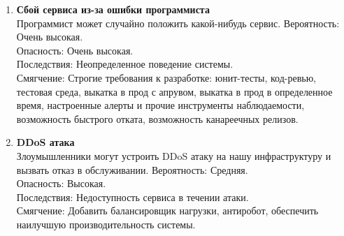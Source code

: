 \begin{enumerate}
      \item \textbf{Сбой сервиса из-за ошибки программиста} \\
            Программист может случайно положить какой-нибудь сервис.
            Вероятность: Очень высокая. \\
            Опасность: Очень высокая. \\
            Последствия: Неопределенное поведение системы. \\
            Смягчение: Строгие требования к разработке: 
            юнит-тесты, код-ревью, тестовая среда, выкатка в прод с апрувом,
            выкатка в прод в определенное время, настроенные алерты и прочие 
            инструменты наблюдаемости, возможность быстрого отката,
            возможность канареечных релизов.

      \item \textbf{DDoS атака} \\
            Злоумышленники могут устроить DDoS атаку на нашу инфраструктуру и 
            вызвать отказ в обслуживании.
            Вероятность: Средняя. \\
            Опасность: Высокая. \\
            Последствия: Недоступность сервиса в течении атаки. \\
            Смягчение: Добавить балансировщик нагрузки, антиробот, 
            обеспечить наилучшую производительность системы.

\end{enumerate}